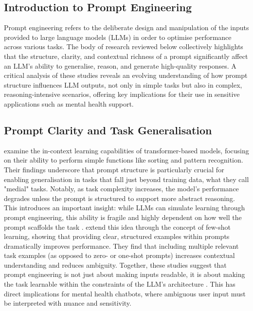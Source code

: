 \subsection{Introduction to Prompt Engineering} 
Prompt engineering refers to the deliberate design and manipulation of the inputs provided to large language models (LLMs) in order to optimise performance across various tasks. The body of research reviewed below collectively highlights that the structure, clarity, and contextual richness of a prompt significantly affect an LLM’s ability to generalise, reason, and generate high-quality responses. A critical analysis of these studies reveals an evolving understanding of how prompt structure influences LLM outputs, not only in simple tasks but also in complex, reasoning-intensive scenarios, offering key implications for their use in sensitive applications such as mental health support.

\subsection{Prompt Clarity and Task Generalisation} 
\cite{garg2021transformers} examine the in-context learning capabilities of transformer-based models, focusing on their ability to perform simple functions like sorting and pattern recognition. Their findings underscore that prompt structure is particularly crucial for enabling generalisation in tasks that fall just beyond training data, what they call "medial" tasks. Notably, as task complexity increases, the model's performance degrades unless the prompt is structured to support more abstract reasoning. This introduces an important insight: while LLMs can simulate learning through prompt engineering, this ability is fragile and highly dependent on how well the prompt scaffolds the task \cite{garg2021transformers}.
\cite{brown2020language} extend this idea through the concept of few-shot learning, showing that providing clear, structured examples within prompts dramatically improves performance. They find that including multiple relevant task examples (as opposed to zero- or one-shot prompts) increases contextual understanding and reduces ambiguity. Together, these studies suggest that prompt engineering is not just about making inputs readable, it is about making the task learnable within the constraints of the LLM’s architecture \cite{brown2020language}. This has direct implications for mental health chatbots, where ambiguous user input must be interpreted with nuance and sensitivity.


